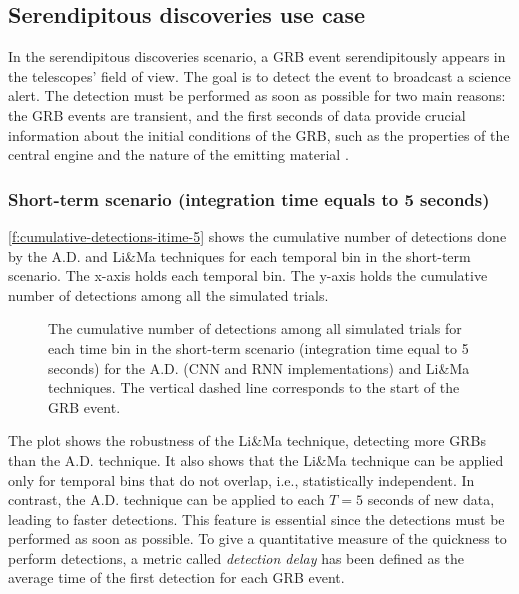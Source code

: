 \subsection{Serendipitous discoveries use case}
\label{s:Serendipitous-Discoveries-Results}
In the serendipitous discoveries scenario, a GRB event serendipitously appears in the telescopes' field of view. The goal is to detect the event to broadcast a science alert. The detection must be performed as soon as possible for two main reasons: the GRB events are transient, and the first seconds of data provide crucial information about the initial conditions of the GRB, such as the properties of the central engine and the nature of the emitting material \cite{kumar2000energetics}.

\subsubsection{Short-term scenario (integration time equals to 5 seconds)}
\label{s:Serendipitous-Discoveries-Results-Short-Term}
\autoref{f:cumulative-detections-itime-5} shows the cumulative number of detections done by the A.D. and Li\&Ma techniques for each temporal bin in the short-term scenario. The x-axis holds each temporal bin. The y-axis holds the cumulative number of detections among all the simulated trials.
\begin{figure}[ht]
\centering

\caption{The cumulative number of detections among all simulated trials for each time bin in the short-term scenario (integration time equal to 5 seconds) for the A.D. (CNN and RNN implementations) and Li\&Ma techniques. The vertical dashed line corresponds to the start of the GRB event.}
\label{f:cumulative-detections-itime-5}
\end{figure}
The plot shows the robustness of the Li\&Ma technique, detecting more GRBs than the A.D. technique. It also shows that the Li\&Ma technique can be applied only for temporal bins that do not overlap, i.e., statistically independent. In contrast, the A.D. technique can be applied to each $T=5$ seconds of new data, leading to faster detections. This feature is essential since the detections must be performed as soon as possible. To give a quantitative measure of the quickness to perform detections, a metric called \textit{detection delay} has been defined as the average time of the first detection for each GRB event.

